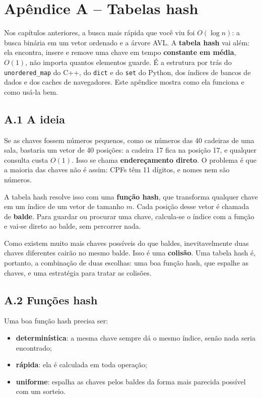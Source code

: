 \section{Apêndice A -- Tabelas hash}

Nos capítulos anteriores, a busca mais rápida que você viu foi $O(\log n)$: a busca binária em um vetor ordenado e a árvore AVL. A \textbf{tabela hash} vai além: ela encontra, insere e remove uma chave em tempo \textbf{constante em média}, $O(1)$, não importa quantos elementos guarde. É a estrutura por trás do \texttt{unordered\_map} do C++, do \texttt{dict} e do \texttt{set} do Python, dos índices de bancos de dados e dos caches de navegadores. Este apêndice mostra como ela funciona e como usá-la bem.

\subsection{A.1 A ideia}

Se as chaves fossem números pequenos, como os números das 40 cadeiras de uma sala, bastaria um vetor de 40 posições: a cadeira 17 fica na posição 17, e qualquer consulta custa $O(1)$. Isso se chama \textbf{endereçamento direto}. O problema é que a maioria das chaves não é assim: CPFs têm 11 dígitos, e nomes nem são números.

A tabela hash resolve isso com uma \textbf{função hash}, que transforma qualquer chave em um índice de um vetor de tamanho $m$. Cada posição desse vetor é chamada de \textbf{balde}. Para guardar ou procurar uma chave, calcula-se o índice com a função e vai-se direto ao balde, sem percorrer nada.

Como existem muito mais chaves possíveis do que baldes, inevitavelmente duas chaves diferentes cairão no mesmo balde. Isso é uma \textbf{colisão}. Uma tabela hash é, portanto, a combinação de duas escolhas: uma boa função hash, que espalhe as chaves, e uma estratégia para tratar as colisões.

\subsection{A.2 Funções hash}

Uma boa função hash precisa ser:

\begin{itemize}
  \item \textbf{determinística}: a mesma chave sempre dá o mesmo índice, senão nada seria encontrado;
  \item \textbf{rápida}: ela é calculada em toda operação;
  \item \textbf{uniforme}: espalha as chaves pelos baldes da forma mais parecida possível com um sorteio.
\end{itemize}


